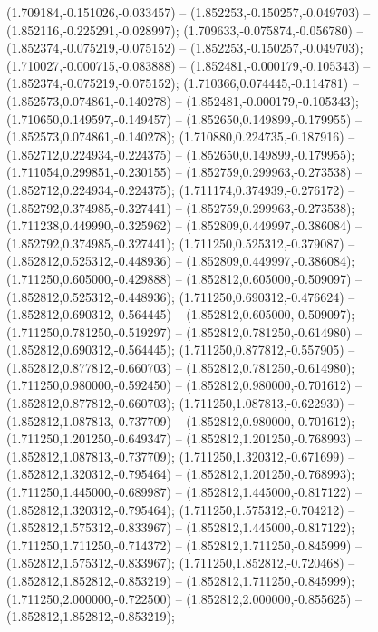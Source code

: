  (1.709184,-0.151026,-0.033457) -- (1.852253,-0.150257,-0.049703) -- (1.852116,-0.225291,-0.028997);
 (1.709633,-0.075874,-0.056780) -- (1.852374,-0.075219,-0.075152) -- (1.852253,-0.150257,-0.049703);
 (1.710027,-0.000715,-0.083888) -- (1.852481,-0.000179,-0.105343) -- (1.852374,-0.075219,-0.075152);
 (1.710366,0.074445,-0.114781) -- (1.852573,0.074861,-0.140278) -- (1.852481,-0.000179,-0.105343);
 (1.710650,0.149597,-0.149457) -- (1.852650,0.149899,-0.179955) -- (1.852573,0.074861,-0.140278);
 (1.710880,0.224735,-0.187916) -- (1.852712,0.224934,-0.224375) -- (1.852650,0.149899,-0.179955);
 (1.711054,0.299851,-0.230155) -- (1.852759,0.299963,-0.273538) -- (1.852712,0.224934,-0.224375);
 (1.711174,0.374939,-0.276172) -- (1.852792,0.374985,-0.327441) -- (1.852759,0.299963,-0.273538);
 (1.711238,0.449990,-0.325962) -- (1.852809,0.449997,-0.386084) -- (1.852792,0.374985,-0.327441);
 (1.711250,0.525312,-0.379087) -- (1.852812,0.525312,-0.448936) -- (1.852809,0.449997,-0.386084);
 (1.711250,0.605000,-0.429888) -- (1.852812,0.605000,-0.509097) -- (1.852812,0.525312,-0.448936);
 (1.711250,0.690312,-0.476624) -- (1.852812,0.690312,-0.564445) -- (1.852812,0.605000,-0.509097);
 (1.711250,0.781250,-0.519297) -- (1.852812,0.781250,-0.614980) -- (1.852812,0.690312,-0.564445);
 (1.711250,0.877812,-0.557905) -- (1.852812,0.877812,-0.660703) -- (1.852812,0.781250,-0.614980);
 (1.711250,0.980000,-0.592450) -- (1.852812,0.980000,-0.701612) -- (1.852812,0.877812,-0.660703);
 (1.711250,1.087813,-0.622930) -- (1.852812,1.087813,-0.737709) -- (1.852812,0.980000,-0.701612);
 (1.711250,1.201250,-0.649347) -- (1.852812,1.201250,-0.768993) -- (1.852812,1.087813,-0.737709);
 (1.711250,1.320312,-0.671699) -- (1.852812,1.320312,-0.795464) -- (1.852812,1.201250,-0.768993);
 (1.711250,1.445000,-0.689987) -- (1.852812,1.445000,-0.817122) -- (1.852812,1.320312,-0.795464);
 (1.711250,1.575312,-0.704212) -- (1.852812,1.575312,-0.833967) -- (1.852812,1.445000,-0.817122);
 (1.711250,1.711250,-0.714372) -- (1.852812,1.711250,-0.845999) -- (1.852812,1.575312,-0.833967);
 (1.711250,1.852812,-0.720468) -- (1.852812,1.852812,-0.853219) -- (1.852812,1.711250,-0.845999);
 (1.711250,2.000000,-0.722500) -- (1.852812,2.000000,-0.855625) -- (1.852812,1.852812,-0.853219);
